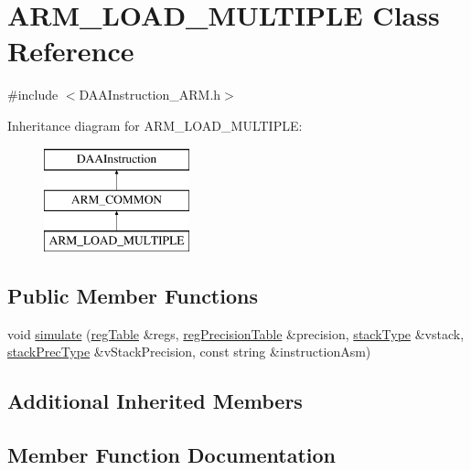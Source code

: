 \hypertarget{classARM__LOAD__MULTIPLE}{}\section{A\+R\+M\+\_\+\+L\+O\+A\+D\+\_\+\+M\+U\+L\+T\+I\+P\+LE Class Reference}
\label{classARM__LOAD__MULTIPLE}


{\ttfamily \#include $<$D\+A\+A\+Instruction\+\_\+\+A\+R\+M.\+h$>$}

Inheritance diagram for A\+R\+M\+\_\+\+L\+O\+A\+D\+\_\+\+M\+U\+L\+T\+I\+P\+LE\+:\begin{figure}[H]
\begin{center}
\leavevmode
\includegraphics[height=3.000000cm]{classARM__LOAD__MULTIPLE}
\end{center}
\end{figure}
\subsection*{Public Member Functions}
\begin{DoxyCompactItemize}
\item 
void \hyperlink{classARM__LOAD__MULTIPLE_a77db594a9b9127619da39e047a12ba41}{simulate} (\hyperlink{DAAInstruction_8h_af0fae93a861de9cf37988d5673cac523}{reg\+Table} \&regs, \hyperlink{DAAInstruction_8h_a0e8cae02815a5f8adc750122d790b455}{reg\+Precision\+Table} \&precision, \hyperlink{DAAInstruction_8h_a1b0e70ac1a04f06c8132055ed01f589f}{stack\+Type} \&vstack, \hyperlink{DAAInstruction_8h_ac5cb793e9dac3fa9693da78b7e29ab30}{stack\+Prec\+Type} \&v\+Stack\+Precision, const string \&instruction\+Asm)
\end{DoxyCompactItemize}
\subsection*{Additional Inherited Members}


\subsection{Member Function Documentation}
\mbox{\label{classARM__LOAD__MULTIPLE_a77db594a9b9127619da39e047a12ba41}} 
